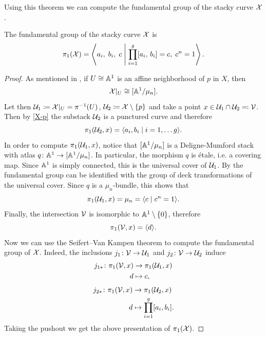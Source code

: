 \documentclass{article}
\begin{document}
Using this theorem we can compute the fundamental group of the stacky curve $\mathcal{X}$.
\begin{prop}\label{prop: fundamental group of stacky curve}
The fundamental group of the stacky curve $\mathcal{X}$ is
\begin{equation} \label{eq: fundamental group of stacky curve}
\pi_1(\mathcal{X}) = \left\langle a_i, \; b_i, \; c \;\middle|\; \prod_{i = 1}^g [a_i, \, b_i] = c, \; c^n = 1 \right\rangle .
\end{equation}
\end{prop}
\begin{proof}
As mentioned in , if $U \cong \mathbb{A}^1$ is an affine neighborhood of $p$ in $X$, then
 \begin{equation}
\mathcal{X}\vert_U \cong [\mathbb{A}^1/\mu_n].
\end{equation}
Let then $\mathcal{U}_1 \coloneqq \mathcal{X}\vert_U = \pi^{-1}(U)$, $\mathcal{U}_2 \coloneqq  \mathcal{X} \setminus \{ p\}$ and take a point $x \in \mathcal{U}_1 \cap \mathcal{U}_2 \eqqcolon \mathcal{V}$.
Then by \eqref{X-p} the substack $\mathcal{U}_2$ is a punctured curve and therefore
\[
\pi_1(\mathcal{U}_2, x) = \langle a_i, b_i \mid i =1, \dots g \rangle.
\]
In order to compute $\pi_1(\mathcal{U}_1, x)$, notice that $[\mathbb{A}^1/\mu_n]$ is a Deligne-Mumford stack with atlas $q \colon \mathbb{A}^1 \to [\mathbb{A}^1/\mu_n]$. In particular, the morphism $q$ is étale, i.e. a covering map. Since $\mathbb{A}^1$ is simply connected, this is the universal cover of $\mathcal{U}_1$. By \cite[Corollary 18.20]{Noohi-foundations} the fundamental group can be identified with the group of deck transformations of the universal cover. Since $q$ is a $\mu_n$-bundle, this shows that
\[
\pi_1(\mathcal{U}_1, x) = \mu_n =  \langle c \mid c^n=1 \rangle.
\]
Finally, the intersection $\mathcal{V}$ is isomorphic to $\mathbb{A}^1 \setminus\{0\}$, therefore
\[
\pi_1(\mathcal{V}, x) = \langle d \rangle.
\]
Now we can use the Seifert--Van Kampen theorem to compute the fundamental group of $\mathcal{X}$. Indeed, the inclusions $j_1\colon \mathcal{V} \to \mathcal{U}_1$ and $j_2 \colon \mathcal{V} \to \mathcal{U}_2$ induce
\begin{align}
j_{1*}\colon \pi_1(\mathcal{V}, x) & \to \pi_1(\mathcal{U}_1, x)\\
d & \mapsto c,
\end{align}
\begin{align}
j_{2*}\colon \pi_1(\mathcal{V}, x) & \to \pi_1(\mathcal{U}_2, x)\\
d & \mapsto \prod_{i = 1}^g [a_i, b_i].
\end{align}
Taking the pushout we get the above presentation of $\pi_1(\mathcal{X})$.
\end{proof}
\end{document}
